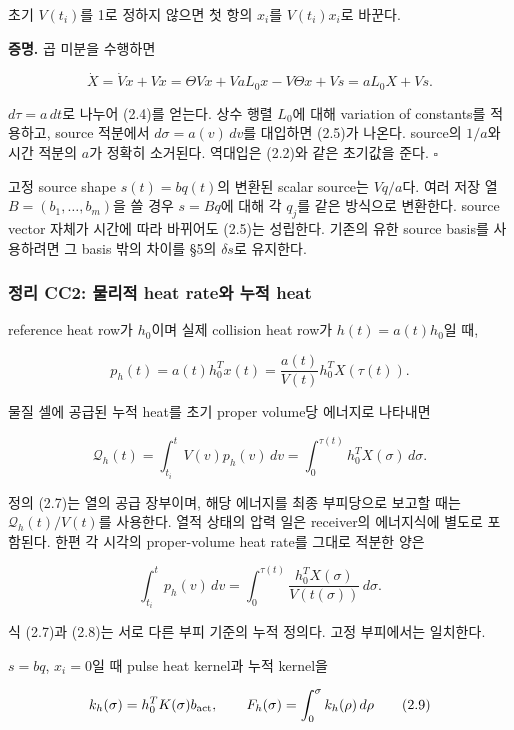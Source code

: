 \documentclass[11pt,a4paper]{article}
\begin{document}
초기 \(V(t_i)\)를 1로 정하지 않으면 첫 항의 \(x_i\)를 \(V(t_i)x_i\)로 바꾼다.

\textbf{증명.} 곱 미분을 수행하면

\[
\dot X=\dot Vx+V\dot x
=\Theta Vx+VaL_0x-V\Theta x+Vs
=aL_0X+Vs.
\]

\(d\tau=a\,dt\)로 나누어 (2.4)를 얻는다. 상수 행렬 \(L_0\)에 대해 variation of constants를 적용하고, source 적분에서 \(d\sigma=a(v)\,dv\)를 대입하면 (2.5)가 나온다. source의 \(1/a\)와 시간 적분의 \(a\)가 정확히 소거된다. 역대입은 (2.2)와 같은 초기값을 준다. \(\square\)

고정 source shape \(s(t)=bq(t)\)의 변환된 scalar source는 \(Vq/a\)다. 여러 저장 열 \(B=(b_1,\ldots,b_m)\)을 쓸 경우 \(s=Bq\)에 대해 각 \(q_j\)를 같은 방식으로 변환한다. source vector 자체가 시간에 따라 바뀌어도 (2.5)는 성립한다. 기존의 유한 source basis를 사용하려면 그 basis 밖의 차이를 §5의 \(\delta s\)로 유지한다.

\hypertarget{uxc815uxb9ac-cc2-uxbb3cuxb9acuxc801-heat-rateuxc640-uxb204uxc801-heat}{%
\subsubsection{정리 CC2: 물리적 heat rate와 누적 heat}\label{uxc815uxb9ac-cc2-uxbb3cuxb9acuxc801-heat-rateuxc640-uxb204uxc801-heat}}

reference heat row가 \(h_0\)이며 실제 collision heat row가 \(h(t)=a(t)h_0\)일 때,

\[
\boxed{
p_h(t)=a(t)h_0^Tx(t)
=\frac{a(t)}{V(t)}h_0^TX(\tau(t)).
}
\tag{2.6}
\]

물질 셀에 공급된 누적 heat를 초기 proper volume당 에너지로 나타내면

\[
\boxed{
\mathcal Q_h(t)
=\int_{t_i}^{t}V(v)p_h(v)\,dv
=\int_0^{\tau(t)}h_0^TX(\sigma)\,d\sigma.
}
\tag{2.7}
\]

정의 (2.7)는 열의 공급 장부이며, 해당 에너지를 최종 부피당으로 보고할 때는 \(\mathcal Q_h(t)/V(t)\)를 사용한다. 열적 상태의 압력 일은 receiver의 에너지식에 별도로 포함된다. 한편 각 시각의 proper-volume heat rate를 그대로 적분한 양은

\[
\int_{t_i}^{t}p_h(v)\,dv
=\int_0^{\tau(t)}
\frac{h_0^TX(\sigma)}{V(t(\sigma))}\,d\sigma.
\tag{2.8}
\]

식 (2.7)과 (2.8)는 서로 다른 부피 기준의 누적 정의다. 고정 부피에서는 일치한다.

\(s=bq\), \(x_i=0\)일 때 pulse heat kernel과 누적 kernel을

\[
k_h(\sigma)=h_0^TK(\sigma)b_{\rm act},\qquad
F_h(\sigma)=\int_0^\sigma k_h(\rho)\,d\rho
\tag{2.9}
\]
\end{document}
